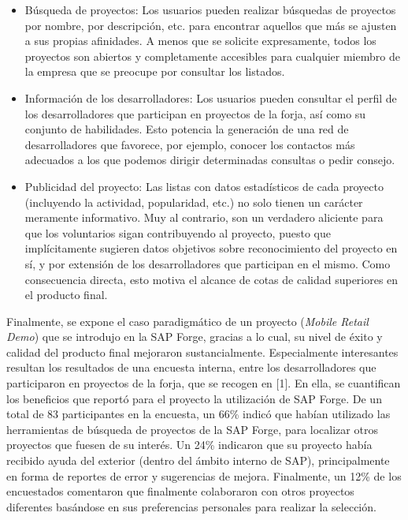 \begin{itemize}
	\item Búsqueda de proyectos: Los usuarios pueden realizar búsquedas de proyectos por nombre, por descripción, etc. para encontrar aquellos que más se ajusten a sus propias afinidades. A menos que se solicite expresamente, todos los proyectos son abiertos y completamente accesibles para cualquier miembro de la empresa que se preocupe por consultar los listados.

	\item Información de los desarrolladores: Los usuarios pueden consultar el perfil de los desarrolladores que participan en proyectos de la forja, así como su conjunto de habilidades. Esto potencia la generación de una red de desarrolladores que favorece, por ejemplo, conocer los contactos más adecuados a los que podemos dirigir determinadas consultas o pedir consejo.

	\item Publicidad del proyecto: Las listas con datos estadísticos de cada proyecto (incluyendo la actividad, popularidad, etc.) no solo tienen un carácter meramente informativo. Muy al contrario, son un verdadero aliciente para que los voluntarios sigan contribuyendo al proyecto, puesto que implícitamente sugieren datos objetivos sobre reconocimiento del proyecto en sí, y por extensión de los desarrolladores que participan en el mismo. Como consecuencia directa, esto motiva el alcance de cotas de calidad superiores en el producto final.
\end{itemize}

\par Finalmente, se expone el caso paradigmático de un proyecto (\emph{Mobile Retail Demo}) que se introdujo en la SAP Forge, gracias a lo cual, su nivel de éxito y calidad del producto final mejoraron sustancialmente. Especialmente interesantes resultan los resultados de una encuesta interna, entre los desarrolladores que participaron en proyectos de la forja, que se recogen en [1]. En ella, se cuantifican los beneficios que reportó para el proyecto la utilización de SAP Forge. De un total de 83 participantes en la encuesta, un 66\% indicó que habían utilizado las herramientas de búsqueda de proyectos de la SAP Forge, para localizar otros proyectos que fuesen de su interés. Un 24\% indicaron que su proyecto había recibido ayuda del exterior (dentro del ámbito interno de SAP), principalmente en forma de reportes de error y sugerencias de mejora. Finalmente, un 12\% de los encuestados comentaron que finalmente colaboraron con otros proyectos diferentes basándose en sus preferencias personales para realizar la selección.


